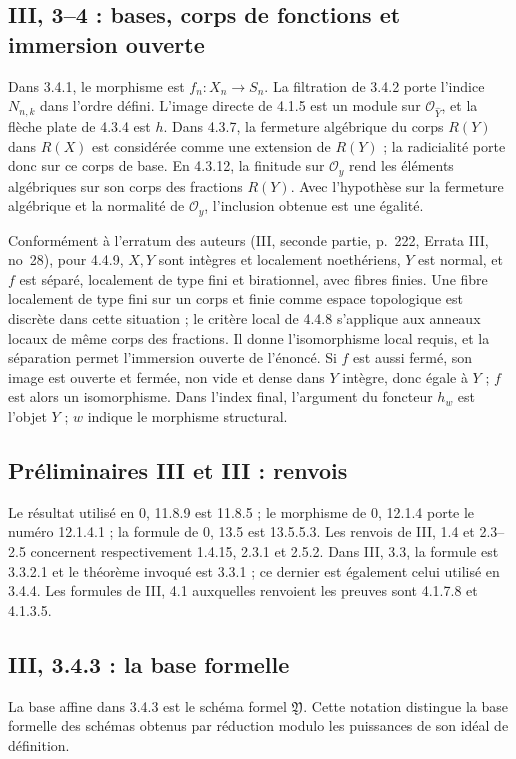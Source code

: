 \documentclass[11pt,a4paper]{article}
\begin{document}
\subsection{III, 3--4 : bases, corps de fonctions et immersion ouverte}
\label{note:base3-localgeometry}
Dans 3.4.1, le morphisme est $f_n:X_n\to S_n$.
La filtration de 3.4.2 porte l'indice $N_{n,k}$ dans l'ordre
défini. L'image directe de 4.1.5 est un module sur
$\mathcal O_{\widehat Y}$, et la flèche plate de 4.3.4 est $h$.
Dans 4.3.7, la fermeture algébrique du corps $R(Y)$ dans
$R(X)$ est considérée comme une extension de $R(Y)$ ; la
radicialité porte donc sur ce corps de base.
En 4.3.12, la finitude sur $\mathcal O_y$ rend les éléments
algébriques sur son corps des fractions $R(Y)$.
Avec l'hypothèse sur la fermeture algébrique et la normalité
de $\mathcal O_y$, l'inclusion obtenue est une égalité.

Conformément à l’erratum des auteurs (III, seconde partie, p.~222, Errata III, no~28), pour 4.4.9, $X,Y$ sont intègres et localement noethériens,
$Y$ est normal, et $f$ est séparé, localement de type fini et
birationnel, avec fibres finies. Une fibre localement de type
fini sur un corps et finie comme espace topologique est discrète
dans cette situation ; le critère local de 4.4.8 s'applique
aux anneaux locaux de même corps des fractions.
Il donne l'isomorphisme local requis, et la séparation permet
l'immersion ouverte de l'énoncé. Si $f$ est aussi fermé, son
image est ouverte et fermée, non vide et dense dans $Y$
intègre, donc égale à $Y$ ; $f$ est alors un isomorphisme.
Dans l'index final, l'argument du foncteur $h_w$ est l'objet
$Y$ ; $w$ indique le morphisme structural.

\subsection{Préliminaires III et III : renvois}
\label{note:base3-refs}
Le résultat utilisé en 0, 11.8.9 est 11.8.5 ; le morphisme
de 0, 12.1.4 porte le numéro 12.1.4.1 ; la formule de
0, 13.5 est 13.5.5.3. Les renvois de III, 1.4 et 2.3--2.5
concernent respectivement 1.4.15, 2.3.1 et 2.5.2.
Dans III, 3.3, la formule est 3.3.2.1 et le théorème invoqué
est 3.3.1 ; ce dernier est également celui utilisé en 3.4.4.
Les formules de III, 4.1 auxquelles renvoient les preuves
sont 4.1.7.8 et 4.1.3.5.

\subsection{III, 3.4.3 : la base formelle}
\label{note:base3-formalbase}
La base affine dans 3.4.3 est le schéma formel $\mathfrak Y$.
Cette notation distingue la base formelle des schémas obtenus
par réduction modulo les puissances de son idéal de définition.
\par
\end{document}
